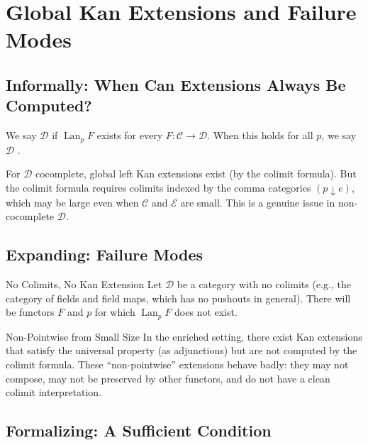 \section{Global Kan Extensions and Failure Modes}
\label{sec:global-kan}

\subsection{Informally: When Can Extensions Always Be Computed?}

We say $\mathcal{D}$  if
$\operatorname{Lan}_p F$ exists for every $F : \mathcal{C} \to \mathcal{D}$.
When this holds for all $p$, we say $\mathcal{D}$ .

For $\mathcal{D}$ cocomplete, global left Kan extensions exist (by the colimit
formula). But the colimit formula requires colimits indexed by the comma
categories $(p \downarrow e)$, which may be large even when $\mathcal{C}$ and
$\mathcal{E}$ are small. This is a genuine issue in non-cocomplete $\mathcal{D}$.

\subsection{Expanding: Failure Modes}

\begin{example}{No Colimits, No Kan Extension}
Let $\mathcal{D}$ be a category with no colimits (e.g., the category of fields
and field maps, which has no pushouts in general). There will be functors $F$
and $p$ for which $\operatorname{Lan}_p F$ does not exist.
\end{example}

\begin{example}{Non-Pointwise from Small Size}
In the enriched setting, there exist Kan extensions that satisfy the universal
property (as adjunctions) but are not computed by the colimit formula. These
``non-pointwise'' extensions behave badly: they may not compose, may not be
preserved by other functors, and do not have a clean colimit interpretation.
\end{example}

\subsection{Formalizing: A Sufficient Condition}

